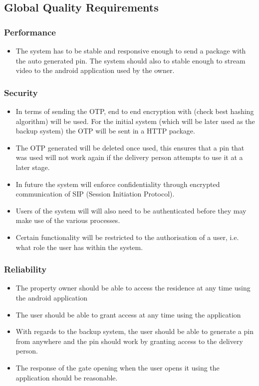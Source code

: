 \documentclass[a4paper,12pt]{article}
\begin{document}
	\subsection{Global Quality Requirements}
	
	\subsubsection{Performance}
	\begin{itemize}
		\item The system has to be stable and responsive enough to send a package with the auto generated pin. The system should also to stable enough to stream video to the android application used by the owner. 
	\end{itemize}
	
	\subsubsection{Security}
	\begin{itemize}
		\item In terms of sending the OTP, end to end encryption with (check best hashing algorithm) will be used. For the initial system (which will be later used as the backup system) the OTP will be sent in a HTTP package. 
		\item The OTP generated will be deleted once used, this ensures that a pin that was used will not work again if the delivery person attempts to use it at a later stage.
		\item In future the system will enforce confidentiality through encrypted communication of SIP (Session Initiation Protocol).
		\item Users of the system will will also need to be authenticated before they may make use of the various processes.
		\item Certain functionality will be restricted to the authorisation of a user, i.e. what role the user has within the system.
	\end{itemize}
	
	\subsubsection{Reliability}
	\begin{itemize}
		\item The property owner should be able to access the residence at any time using the android application 
		\item The user should be able to grant access at any time using the application
		\item With regards to the backup system, the user should be able to generate a pin from anywhere and the pin should work by granting access to the delivery person. 
		\item The response of the gate opening when the user opens it using the application should be reasonable.
	\end{itemize}
	
\end{document}
